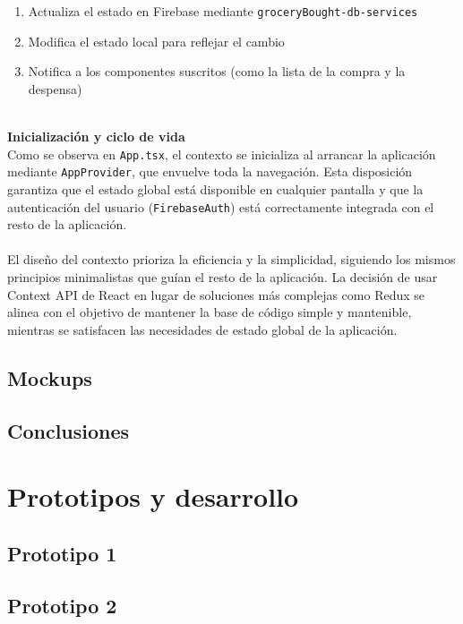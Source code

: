 \documentclass[twoside, openright, 11pt]{report}
\begin{document}
				\begin{enumerate}
					\item Actualiza el estado en Firebase mediante \texttt{groceryBought-db-services}
					\item Modifica el estado local para reflejar el cambio
					\item Notifica a los componentes suscritos (como la lista de la compra y la despensa)
				\end{enumerate}
				
				\textbf{\\Inicialización y ciclo de vida}\\
				Como se observa en \texttt{App.tsx}, el contexto se inicializa al arrancar la aplicación mediante \texttt{AppProvider}, que envuelve toda la navegación. Esta disposición garantiza que el estado global está disponible en cualquier pantalla y que la autenticación del usuario (\texttt{FirebaseAuth}) está correctamente integrada con el resto de la aplicación.
				\\\\
				El diseño del contexto prioriza la eficiencia y la simplicidad, siguiendo los mismos principios minimalistas que guían el resto de la aplicación. La decisión de usar Context API de React en lugar de soluciones más complejas como Redux se alinea con el objetivo de mantener la base de código simple y mantenible, mientras se satisfacen las necesidades de estado global de la aplicación.
	
	
	\section{Mockups}
	\section{Conclusiones}

\chapter{Prototipos y desarrollo}\label{cap.prototipos y desarrollo}
  \section{Prototipo 1}
  \section{Prototipo 2}
\end{document}
